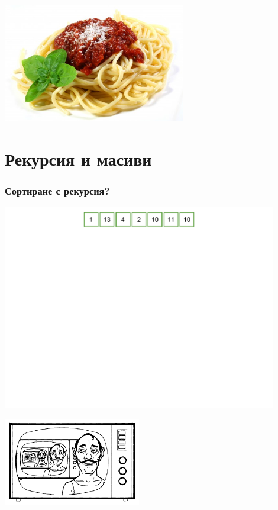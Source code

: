 \documentclass{beamer}
\begin{document}
\begin{frame}
\begin{center}
   \includegraphics[width=8cm]{images/spaghetti}
\end{center}

\end{frame}


\section{Рекурсия и масиви}


\begin{frame}[fragile]
\frametitle{Сортиране с рекурсия?}

\begin{center}
   \includegraphics[width=12cm]{images/array_unsorted}
   
   \vspace{-210px}
   \includegraphics[width=6cm]{images/rec_wirt}
\end{center}

\end{frame}
\end{document}
